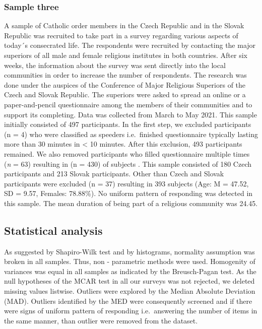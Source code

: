 \documentclass[ijerph,article,accept,moreauthors,pdftex]{mdpi}
\begin{document}
\hypertarget{sample-three}{%
\subsubsection{Sample three}\label{sample-three}}

A sample of Catholic order members in the Czech Republic and in the
Slovak Republic was recruited to take part in a survey regarding various
aspects of today´s consecrated life. The respondents were recruited by
contacting the major superiors of all male and female religious
institutes in both countries. After six weeks, the information about the
survey was sent directly into the local communities in order to increase
the number of respondents. The research was done under the auspices of
the Conference of Major Religious Superiors of the Czech and Slovak
Republic. The superiors were asked to spread an online or a
paper-and-pencil questionnaire among the members of their communities
and to support its completing. Data was collected from March to May
2021. This sample initially consisted of 497 participants. In the first
step, we excluded participants (n = 4) who were classified as speeders
i.e.~finished questionnaire typically lasting more than 30 minutes in
\textless{} 10 minutes. After this exclusion, 493 participants remained.
We also removed participants who filled questionnaire multiple times
(\emph{n} = 63) resulting in (n = 430) of subjects . This sample
consisted of 180 Czech participants and 213 Slovak participants. Other
than Czech and Slovak participants were excluded (n = 37) resulting in
393 subjects (Age: M = 47.52, SD = 9.57, Females: 78.88\%). No uniform
pattern of responding was detected in this sample. The mean duration of
being part of a religious community was 24.45.

\hypertarget{statistical-analysis}{%
\subsection{Statistical analysis}\label{statistical-analysis}}

As suggested by Shapiro-Wilk test and by histograms, normality
assumption was broken in all samples. Thus, non - parametric methods
were used. Homogenity of variances was equal in all samples as indicated
by the Breusch-Pagan test. As the null hypotheses of the MCAR test in
all our surveys was not rejected, we deleted missing values listwise.
Outliers were explored by the Median Absolute Deviation (MAD). Outliers
identified by the MED were consequently screened and if there were signs
of uniform pattern of responding i.e.~answering the number of items in
the same manner, than outlier were removed from the dataset.
\end{document}
